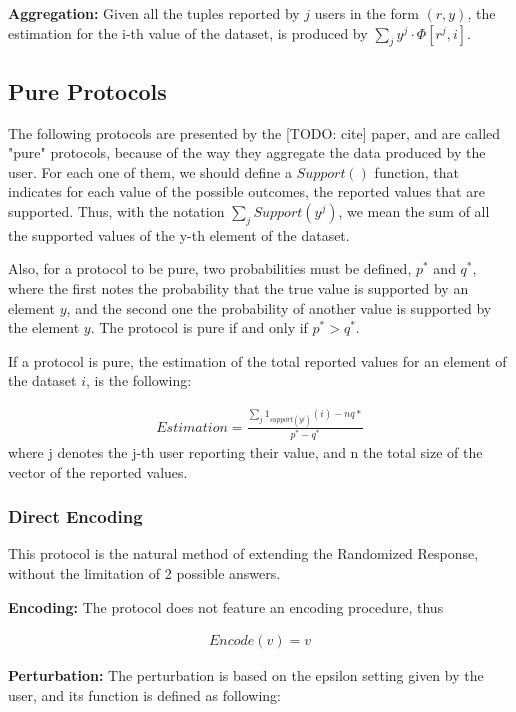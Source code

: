 \textbf{Aggregation:} Given all the tuples reported by $j$ users in the form $(r, y)$, the estimation for the i-th value of the dataset, is produced by $\sum_{j} y^j \cdot \Phi[r^j,i]$.

\subsection{Pure Protocols}

The following protocols are presented by the [TODO: cite] paper, and are called "pure" protocols, because of the way they aggregate the data produced by the user. For each one of them, we should define a $Support()$ function, that indicates for each value of the possible outcomes, the reported values that are supported. Thus, with the notation $\sum_{j} Support(y^j)$, we mean the sum of all the supported values of the y-th element of the dataset.

Also, for a protocol to be pure, two probabilities must be defined, $p^*$ and $q^*$, where the first notes the probability that the true value is supported by an element $y$, and the second one the probability of another value is supported by the element $y$. The protocol is pure if and only if $p^* > q^*$.

If a protocol is pure, the estimation of the total reported values for an element of the dataset $i$, is the following:

\begin{align}
    Estimation = \frac{\sum_{j} 1_{support(y^j)}(i) - nq*}{p^* - q^*}
\end{align}
where j denotes the j-th user reporting their value, and n the total size of the vector of the reported values.


\subsubsection{Direct Encoding}

This protocol is the natural method of extending the Randomized Response, without the limitation of 2 possible answers. 

\textbf{Encoding:} The protocol does not feature an encoding procedure, thus 

\begin{align*}
    Encode(v) = v
\end{align*}

\textbf{Perturbation:} The perturbation is based on the epsilon setting given by the user, and its function is defined as following:

